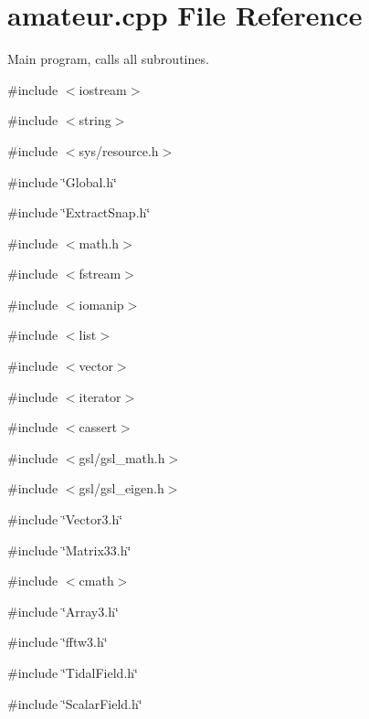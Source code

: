 \section{amateur.cpp File Reference}
\label{amateur_8cpp}


Main program, calls all subroutines.  


{\ttfamily \#include $<$iostream$>$}\par
{\ttfamily \#include $<$string$>$}\par
{\ttfamily \#include $<$sys/resource.h$>$}\par
{\ttfamily \#include \char`\"{}Global.h\char`\"{}}\par
{\ttfamily \#include \char`\"{}ExtractSnap.h\char`\"{}}\par
{\ttfamily \#include $<$math.h$>$}\par
{\ttfamily \#include $<$fstream$>$}\par
{\ttfamily \#include $<$iomanip$>$}\par
{\ttfamily \#include $<$list$>$}\par
{\ttfamily \#include $<$vector$>$}\par
{\ttfamily \#include $<$iterator$>$}\par
{\ttfamily \#include $<$cassert$>$}\par
{\ttfamily \#include $<$gsl/gsl\_\-math.h$>$}\par
{\ttfamily \#include $<$gsl/gsl\_\-eigen.h$>$}\par
{\ttfamily \#include \char`\"{}Vector3.h\char`\"{}}\par
{\ttfamily \#include \char`\"{}Matrix33.h\char`\"{}}\par
{\ttfamily \#include $<$cmath$>$}\par
{\ttfamily \#include \char`\"{}Array3.h\char`\"{}}\par
{\ttfamily \#include \char`\"{}fftw3.h\char`\"{}}\par
{\ttfamily \#include \char`\"{}TidalField.h\char`\"{}}\par
{\ttfamily \#include \char`\"{}ScalarField.h\char`\"{}}\par
